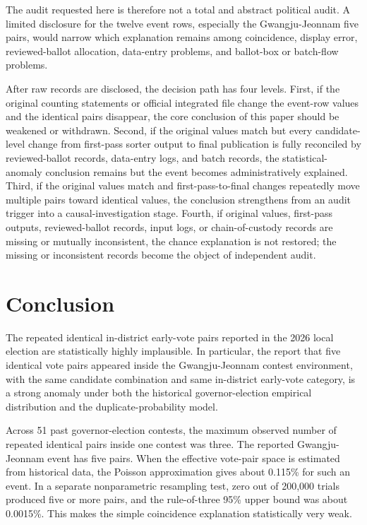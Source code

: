 \documentclass[preprint]{IEIE}
\begin{document}
The audit requested here is therefore not a total and abstract political audit. A limited disclosure for the twelve event rows, especially the Gwangju-Jeonnam five pairs, would narrow which explanation remains among coincidence, display error, reviewed-ballot allocation, data-entry problems, and ballot-box or batch-flow problems.

After raw records are disclosed, the decision path has four levels. First, if the original counting statements or official integrated file change the event-row values and the identical pairs disappear, the core conclusion of this paper should be weakened or withdrawn. Second, if the original values match but every candidate-level change from first-pass sorter output to final publication is fully reconciled by reviewed-ballot records, data-entry logs, and batch records, the statistical-anomaly conclusion remains but the event becomes administratively explained. Third, if the original values match and first-pass-to-final changes repeatedly move multiple pairs toward identical values, the conclusion strengthens from an audit trigger into a causal-investigation stage. Fourth, if original values, first-pass outputs, reviewed-ballot records, input logs, or chain-of-custody records are missing or mutually inconsistent, the chance explanation is not restored; the missing or inconsistent records become the object of independent audit.

\section{Conclusion}

The repeated identical in-district early-vote pairs reported in the 2026 local election are statistically highly implausible. In particular, the report that five identical vote pairs appeared inside the Gwangju-Jeonnam contest environment, with the same candidate combination and same in-district early-vote category, is a strong anomaly under both the historical governor-election empirical distribution and the duplicate-probability model.

Across 51 past governor-election contests, the maximum observed number of repeated identical pairs inside one contest was three. The reported Gwangju-Jeonnam event has five pairs. When the effective vote-pair space is estimated from historical data, the Poisson approximation gives about 0.115\% for such an event. In a separate nonparametric resampling test, zero out of 200,000 trials produced five or more pairs, and the rule-of-three 95\% upper bound was about 0.0015\%. This makes the simple coincidence explanation statistically very weak.
\end{document}
